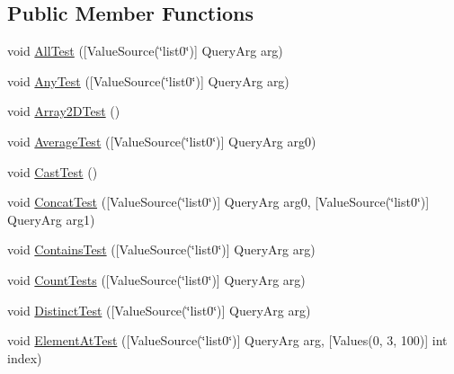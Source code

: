 \subsection*{Public Member Functions}
\begin{DoxyCompactItemize}
\item 
void \mbox{\hyperlink{class_leap_1_1_unity_1_1_tests_1_1_query_tests_a1c19b93c5718249f0a53a473c6180fb9}{All\+Test}} (\mbox{[}Value\+Source(\char`\"{}list0\char`\"{})\mbox{]} Query\+Arg arg)
\item 
void \mbox{\hyperlink{class_leap_1_1_unity_1_1_tests_1_1_query_tests_abc698ee6c3cf73420bcc9d98f4ea35d5}{Any\+Test}} (\mbox{[}Value\+Source(\char`\"{}list0\char`\"{})\mbox{]} Query\+Arg arg)
\item 
void \mbox{\hyperlink{class_leap_1_1_unity_1_1_tests_1_1_query_tests_a6447332ac378b460ab1384afdb151f26}{Array2\+D\+Test}} ()
\item 
void \mbox{\hyperlink{class_leap_1_1_unity_1_1_tests_1_1_query_tests_a839082e5ff9fd18472ac343612a53e33}{Average\+Test}} (\mbox{[}Value\+Source(\char`\"{}list0\char`\"{})\mbox{]} Query\+Arg arg0)
\item 
void \mbox{\hyperlink{class_leap_1_1_unity_1_1_tests_1_1_query_tests_ac249029ca844b0885fd8488b2d35c0b0}{Cast\+Test}} ()
\item 
void \mbox{\hyperlink{class_leap_1_1_unity_1_1_tests_1_1_query_tests_aba795b21c7c5b21ce0e665dd3e0a1e70}{Concat\+Test}} (\mbox{[}Value\+Source(\char`\"{}list0\char`\"{})\mbox{]} Query\+Arg arg0, \mbox{[}Value\+Source(\char`\"{}list0\char`\"{})\mbox{]} Query\+Arg arg1)
\item 
void \mbox{\hyperlink{class_leap_1_1_unity_1_1_tests_1_1_query_tests_a4d763e6e0917742da84fce7bd5a9d008}{Contains\+Test}} (\mbox{[}Value\+Source(\char`\"{}list0\char`\"{})\mbox{]} Query\+Arg arg)
\item 
void \mbox{\hyperlink{class_leap_1_1_unity_1_1_tests_1_1_query_tests_ae07891711ed2aba14f29f0769dee281f}{Count\+Tests}} (\mbox{[}Value\+Source(\char`\"{}list0\char`\"{})\mbox{]} Query\+Arg arg)
\item 
void \mbox{\hyperlink{class_leap_1_1_unity_1_1_tests_1_1_query_tests_a7f6724647f757d5d2d62f3e4b2d3ccc8}{Distinct\+Test}} (\mbox{[}Value\+Source(\char`\"{}list0\char`\"{})\mbox{]} Query\+Arg arg)
\item 
void \mbox{\hyperlink{class_leap_1_1_unity_1_1_tests_1_1_query_tests_ad54707c01c325e5af9184a40da2f19d0}{Element\+At\+Test}} (\mbox{[}Value\+Source(\char`\"{}list0\char`\"{})\mbox{]} Query\+Arg arg, \mbox{[}Values(0, 3, 100)\mbox{]} int index)

\end{DoxyCompactItemize}
